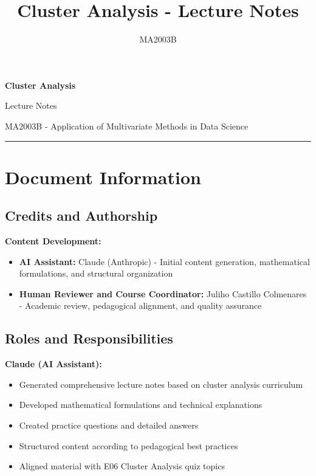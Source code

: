 \documentclass[
]{article}
\title{Cluster Analysis - Lecture Notes}
\author{MA2003B}
\date{}
\begin{document}
\maketitle

\textbf{Cluster Analysis}

Lecture Notes

MA2003B - Application of Multivariate Methods in Data Science

\begin{center}\rule{0.5\linewidth}{0.5pt}\end{center}

\textbf{ }

\section{Document Information}

\textbf{ }

\subsection{Credits and Authorship}

\textbf{Content Development:}

\begin{itemize}
\item
  \textbf{AI Assistant:} Claude (Anthropic) - Initial content
  generation, mathematical formulations, and structural organization
\item
  \textbf{Human Reviewer and Course Coordinator:} Juliho Castillo
  Colmenares - Academic review, pedagogical alignment, and quality
  assurance
\end{itemize}

\textbf{ }

\subsection{Roles and Responsibilities}

\textbf{Claude (AI Assistant):}

\begin{itemize}
\item
  Generated comprehensive lecture notes based on cluster analysis
  curriculum
\item
  Developed mathematical formulations and technical explanations
\item
  Created practice questions and detailed answers
\item
  Structured content according to pedagogical best practices
\item
  Aligned material with E06 Cluster Analysis quiz topics
\end{itemize}
\end{document}
